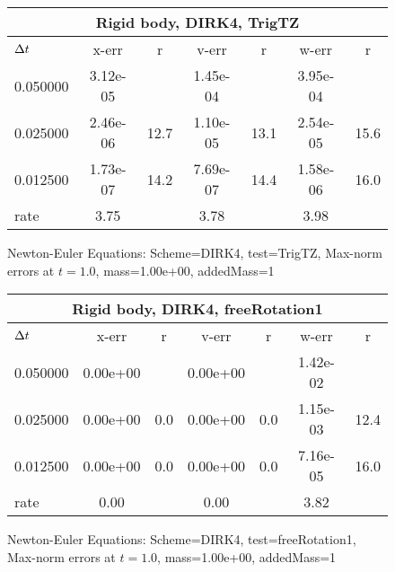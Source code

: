 \begin{figure}[hbt]\tableFont %
\begin{center}
\begin{tabular}{|l|c|c|c|c|c|c|} \hline 
\multicolumn{7}{|c|}{Rigid body, DIRK4, TrigTZ}     \\ \hline
${\Delta t}$    &  x-err   &   r   &  v-err   &   r   &  w-err   &   r   \\ \hline
0.050000 & 3.12e-05 &       & 1.45e-04 &       & 3.95e-04 &         \\ \hline
0.025000 & 2.46e-06 & 12.7  & 1.10e-05 & 13.1  & 2.54e-05 & 15.6    \\ \hline
0.012500 & 1.73e-07 & 14.2  & 7.69e-07 & 14.4  & 1.58e-06 & 16.0    \\ \hline
 rate    &  3.75   &       &  3.78   &       &  3.98   &          \\ \hline
\end{tabular}
\caption{Newton-Euler Equations: Scheme=DIRK4, test=TrigTZ, Max-norm errors at $t= 1.0$, mass=1.00e+00, addedMass=1 }
\label{tab:TestTrigTZ_SchemeDIRK4}
\end{center}
\end{figure} 
\begin{figure}[hbt]\tableFont %
\begin{center}
\begin{tabular}{|l|c|c|c|c|c|c|} \hline 
\multicolumn{7}{|c|}{Rigid body, DIRK4, freeRotation1}     \\ \hline
${\Delta t}$    &  x-err   &   r   &  v-err   &   r   &  w-err   &   r   \\ \hline
0.050000 & 0.00e+00 &       & 0.00e+00 &       & 1.42e-02 &         \\ \hline
0.025000 & 0.00e+00 &  0.0  & 0.00e+00 &  0.0  & 1.15e-03 & 12.4    \\ \hline
0.012500 & 0.00e+00 &  0.0  & 0.00e+00 &  0.0  & 7.16e-05 & 16.0    \\ \hline
 rate    &  0.00   &       &  0.00   &       &  3.82   &          \\ \hline
\end{tabular}
\caption{Newton-Euler Equations: Scheme=DIRK4, test=freeRotation1, Max-norm errors at $t= 1.0$, mass=1.00e+00, addedMass=1 }
\label{tab:TestfreeRotation1_SchemeDIRK4}
\end{center}
\end{figure} 
